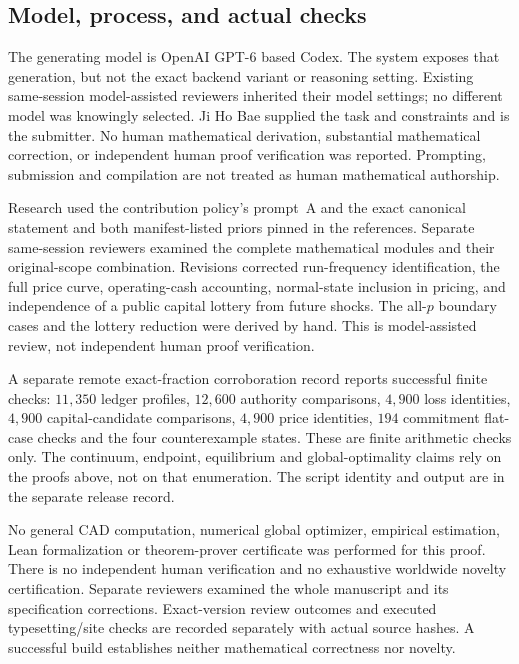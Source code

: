 \documentclass[11pt,a4paper]{article}
\numberwithin{equation}{section}
\theoremstyle{definition}
\begin{document}
\subsection{Model, process, and actual checks}
The generating model is OpenAI GPT-6 based Codex. The system exposes that
generation, but not the exact backend variant or reasoning setting.
Existing same-session model-assisted reviewers inherited their model
settings; no different model was knowingly selected. Ji Ho Bae supplied
the task and constraints and is the submitter. No human mathematical
derivation, substantial mathematical correction, or independent human
proof verification was reported. Prompting, submission and compilation
are not treated as human mathematical authorship.

Research used the contribution policy's prompt~A and the exact canonical
statement and both manifest-listed priors pinned in the references.
Separate same-session reviewers examined the complete mathematical
modules and their original-scope combination. Revisions corrected
run-frequency identification, the full price curve, operating-cash
accounting, normal-state inclusion in pricing, and independence of a
public capital lottery from future shocks. The all-\(p\) boundary cases
and the lottery reduction were derived by hand. This is model-assisted
review, not independent human proof verification.

A separate remote exact-fraction corroboration record reports successful
finite checks: \(11{,}350\) ledger profiles, \(12{,}600\) authority
comparisons, \(4{,}900\) loss identities, \(4{,}900\) capital-candidate
comparisons, \(4{,}900\) price identities, \(194\) commitment flat-case
checks and the four counterexample states. These are finite arithmetic
checks only. The continuum, endpoint, equilibrium and global-optimality
claims rely on the proofs above, not on that enumeration. The script
identity and output are in the separate release record.

No general CAD computation, numerical global optimizer, empirical
estimation, Lean formalization or theorem-prover certificate was
performed for this proof. There is no independent human verification
and no exhaustive worldwide novelty certification. Separate reviewers
examined the whole manuscript and its specification corrections. Exact-version
review outcomes and executed typesetting/site checks are recorded separately
with actual source hashes. A successful build establishes neither
mathematical correctness nor novelty.
\end{document}
